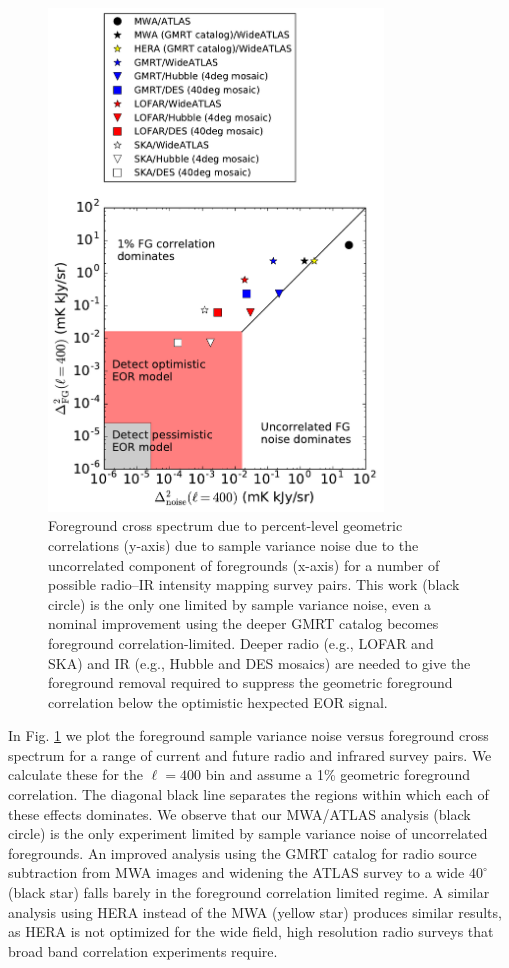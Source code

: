 \documentclass[numberedappendix]{emulateapj}
\begin{document}
\begin{figure}[h]
\centering
\includegraphics[width=3.5in]{images/noise_vs_corr_expt_study.pdf}
\caption{Foreground cross spectrum due to percent-level geometric correlations (y-axis) due to sample variance noise due to the uncorrelated component of foregrounds (x-axis) for a number of possible radio--IR intensity mapping survey pairs. This work (black circle) is the only one limited by sample variance noise, even a nominal improvement using the deeper GMRT catalog becomes foreground correlation-limited. Deeper radio (e.g., LOFAR and SKA) and IR (e.g., Hubble and DES mosaics) are needed to give the foreground removal required to suppress the geometric foreground correlation below the optimistic hexpected EOR signal.}
\label{fig:noisecorrstudy}
\end{figure}

In Fig. \ref{fig:noisecorrstudy} we plot the foreground sample variance noise versus foreground cross spectrum for a range of current and future radio and infrared survey pairs. We calculate these for the $\ell=400$ bin and assume a 1\% geometric foreground correlation. The diagonal black line separates the regions within which each of these effects dominates. We observe that our MWA/ATLAS analysis (black circle) is the only experiment limited by sample variance noise of uncorrelated foregrounds. An improved analysis using the GMRT catalog for radio source subtraction from MWA images and widening the ATLAS survey to a wide $40^\circ$ (black star) falls barely in the foreground correlation limited regime. A similar analysis using HERA instead of the MWA (yellow star) produces similar results, as HERA is not optimized for the wide field, high resolution radio surveys that broad band correlation experiments require. 
\end{document}
